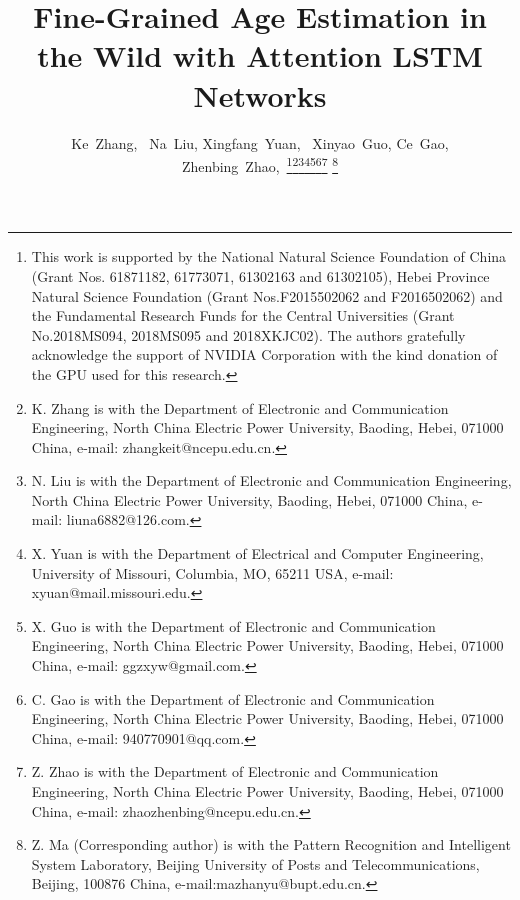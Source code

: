 \documentclass[journal]{IEEEtran}
\begin{document}
\title{Fine-Grained Age Estimation in the Wild with Attention LSTM Networks}


\author{Ke~Zhang,~
        Na~Liu,
        Xingfang~Yuan,~
        Xinyao~Guo,
        Ce~Gao,
        Zhenbing~Zhao,~\thanks{This work is supported by the National Natural Science Foundation of China (Grant Nos. 61871182, 61773071, 61302163 and 61302105), Hebei Province Natural Science Foundation (Grant Nos.F2015502062 and F2016502062) and the Fundamental Research Funds for the Central Universities (Grant No.2018MS094, 2018MS095 and 2018XKJC02). The authors gratefully acknowledge the support of NVIDIA Corporation with the kind donation of the GPU used for this research.}\thanks{K. Zhang is with the Department
of Electronic and Communication Engineering, North China Electric Power University, Baoding,
Hebei, 071000 China, e-mail: zhangkeit@ncepu.edu.cn.}\thanks{N. Liu is with the Department
	of Electronic and Communication Engineering, North China Electric Power University, Baoding,
Hebei, 071000 China, e-mail: liuna6882@126.com.}\thanks{X. Yuan is with the Department
	of Electrical and Computer Engineering, University of Missouri, Columbia,
	MO, 65211 USA, e-mail: xyuan@mail.missouri.edu.}\thanks{X. Guo is with the Department
	of Electronic and Communication Engineering, North China Electric Power University, Baoding,
	Hebei, 071000 China, e-mail: ggzxyw@gmail.com.}\thanks{C. Gao is with the Department
  of Electronic and Communication Engineering, North China Electric Power University, Baoding,
  Hebei, 071000 China, e-mail: 940770901@qq.com.}\thanks{Z. Zhao is with the Department
  of Electronic and Communication Engineering, North China Electric Power University, Baoding,
  Hebei, 071000 China, e-mail: zhaozhenbing@ncepu.edu.cn.}
\thanks{Z. Ma (Corresponding author) is with the Pattern Recognition and Intelligent System Laboratory, Beijing University of Posts and Telecommunications, Beijing,
  100876 China, e-mail:mazhanyu@bupt.edu.cn.}}



















\maketitle
\end{document}
